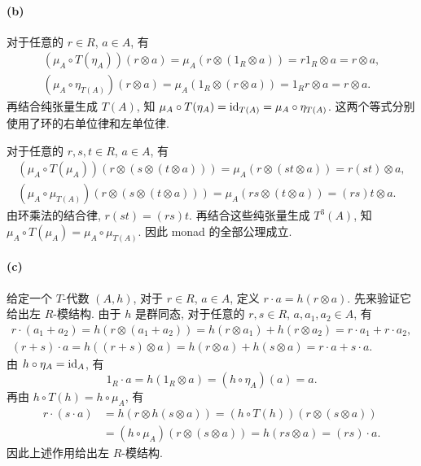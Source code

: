 \documentclass{article}
\begin{document}
\begin{solution}
	\paragraph{(b)} 对于任意的 $r \in R$, $a \in A$, 有
	\begin{gather*}
		(\mu_A \circ T(\eta_A))(r \otimes a)
		= \mu_A(r \otimes (1_R \otimes a))
		= r1_R \otimes a = r \otimes a, \\
		(\mu_A \circ \eta_{T(A)})(r \otimes a)
		= \mu_A(1_R \otimes (r \otimes a))
		= 1_Rr \otimes a = r \otimes a.
	\end{gather*}
	再结合纯张量生成 $T(A)$, 知 $\mu_A \circ T(\eta_A) = \operatorname{id}_{T(A)} = \mu_A \circ \eta_{T(A)}$. 这两个等式分别使用了环的右单位律和左单位律.

	对于任意的 $r,s,t \in R$, $a \in A$, 有
	\begin{gather*}
		(\mu_A \circ T(\mu_A))(r \otimes (s \otimes (t \otimes a)))
		= \mu_A(r \otimes (st \otimes a)) = r(st) \otimes a, \\
		(\mu_A \circ \mu_{T(A)})(r \otimes (s \otimes (t \otimes a)))
		= \mu_A(rs \otimes (t \otimes a)) = (rs)t \otimes a.
	\end{gather*}
	由环乘法的结合律, $r(st) = (rs)t$. 再结合这些纯张量生成 $T^3(A)$, 知 $\mu_A \circ T(\mu_A) = \mu_A \circ \mu_{T(A)}$. 因此 monad 的全部公理成立.

	\paragraph{(c)} 给定一个 $T$-代数 $(A,h)$, 对于 $r \in R$, $a \in A$, 定义 $r \cdot a = h(r \otimes a)$. 先来验证它给出左 $R$-模结构. 由于 $h$ 是群同态, 对于任意的 $r,s \in R$, $a,a_1,a_2 \in A$, 有
	\begin{gather*}
		r \cdot (a_1 + a_2) = h(r \otimes (a_1 + a_2))
		= h(r \otimes a_1) + h(r \otimes a_2)
		= r \cdot a_1 + r \cdot a_2, \\
		(r+s) \cdot a = h((r+s) \otimes a)
		= h(r \otimes a) + h(s \otimes a)
		= r \cdot a + s \cdot a.
	\end{gather*}
	由 $h \circ \eta_A = \operatorname{id}_A$, 有
	\[ 1_R \cdot a = h(1_R \otimes a) = (h \circ \eta_A)(a) = a. \]
	再由 $h \circ T(h) = h \circ \mu_A$, 有
	\begin{align*}
		r \cdot (s \cdot a)
		&= h(r \otimes h(s \otimes a))
		= (h \circ T(h))(r \otimes (s \otimes a)) \\
		&= (h \circ \mu_A)(r \otimes (s \otimes a))
		= h(rs \otimes a) = (rs) \cdot a.
	\end{align*}
	因此上述作用给出左 $R$-模结构.


\end{solution}
\end{document}
